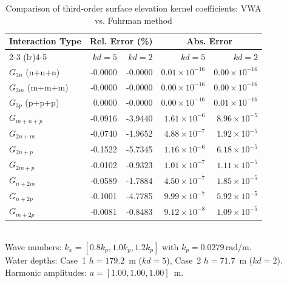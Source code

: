 \documentclass[lineno]{JFM-FLM_Au}
\begin{document}
\begin{table}
\centering
\caption{Comparison of third-order surface elevation kernel coefficients: VWA vs. Fuhrman method}
\label{tab:vwa_fuhrman_eta_comparison}
\begin{tabular}{lrrrr}
\toprule
Interaction Type & \multicolumn{2}{c}{Rel. Error (\%)} & \multicolumn{2}{c}{Abs. Error} \\
\cmidrule(lr){2-3} \cmidrule(lr){4-5}
 & $kd=5$ & $kd=2$ & $kd=5$ & $kd=2$ \\
\midrule
$G_{3n}$ (n+n+n)   & -0.0000 & -0.0000 & $0.01 \times 10^{-16}$ & $0.00 \times 10^{-16}$ \\
$G_{3m}$ (m+m+m)   & -0.0000 & -0.0000 & $0.00 \times 10^{-16}$ & $0.00 \times 10^{-16}$ \\
$G_{3p}$ (p+p+p)   &  0.0000 & -0.0000 & $0.00 \times 10^{-16}$ & $0.01 \times 10^{-16}$ \\
$G_{m+n+p}$        & -0.0916 & -3.9440 & $1.61 \times 10^{-6}$ & $8.96 \times 10^{-5}$ \\
$G_{2n+m}$         & -0.0740 & -1.9652 & $4.88 \times 10^{-7}$ & $1.92 \times 10^{-5}$ \\
$G_{2n+p}$         & -0.1522 & -5.7345 & $1.16 \times 10^{-6}$ & $6.18 \times 10^{-5}$ \\
$G_{2m+p}$         & -0.0102 & -0.9323 & $1.01 \times 10^{-7}$ & $1.11 \times 10^{-5}$ \\
$G_{n+2m}$         & -0.0589 & -1.7884 & $4.50 \times 10^{-7}$ & $1.85 \times 10^{-5}$ \\
$G_{n+2p}$         & -0.1001 & -4.7785 & $9.99 \times 10^{-7}$ & $5.92 \times 10^{-5}$ \\
$G_{m+2p}$         & -0.0081 & -0.8483 & $9.12 \times 10^{-8}$ & $1.09 \times 10^{-5}$ \\
\bottomrule
\end{tabular}
\vspace{0.5ex}
{\\ \small Wave numbers: $k_x = [0.8k_p, 1.0k_p, 1.2k_p]$ with $k_p = 0.0279\,\text{rad/m}$.}\\
{\small Water depths: Case~1 $h = 179.2$~m ($kd = 5$), Case~2 $h = 71.7$~m ($kd = 2$).}\\
{\small Harmonic amplitudes: $a = [1.00, 1.00, 1.00]$~m.}\\
\end{table}
\end{document}
